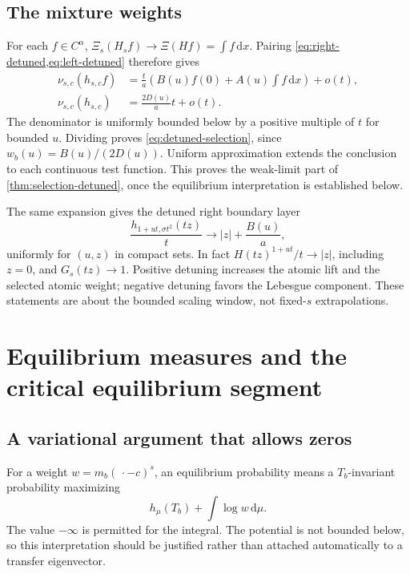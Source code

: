 \documentclass[11pt,a4paper]{article}
\numberwithin{equation}{section}
\theoremstyle{definition}
\theoremstyle{remark}
\newcommand{\dd}{\,\mathrm d}
\begin{document}
\subsection{The mixture weights}
For each $f\in C^\alpha$,
$\Xi_s(H_sf)\to\Xi(Hf)=\int f\dd x$. Pairing
\cref{eq:right-detuned,eq:left-detuned} therefore gives
\begin{align}
 \nu_{s,c}(h_{s,c}f)
    &=\frac{t}{a}\left(B(u)f(0)+A(u)\int f\dd x\right)+o(t),\\
 \nu_{s,c}(h_{s,c})&=\frac{2D(u)}a t+o(t).
 \label{eq:detuned-pairings}
\end{align}
The denominator is uniformly bounded below by a positive multiple of
$t$ for bounded $u$. Dividing proves \cref{eq:detuned-selection}, since
$w_b(u)=B(u)/(2D(u))$. Uniform approximation extends the conclusion to
each continuous test function. This proves the weak-limit part of
\cref{thm:selection-detuned}, once the equilibrium interpretation is
established below.

The same expansion gives the detuned right boundary layer
\begin{equation}
 \frac{h_{1+ut,\sigma t^2}(tz)}t
       \longrightarrow |z|+\frac{B(u)}a,
 \label{eq:boundary-detuned}
\end{equation}
uniformly for $(u,z)$ in compact sets. In fact
$H(tz)^{1+ut}/t\to|z|$, including $z=0$, and $G_s(tz)\to1$.
Positive detuning increases the atomic lift and the selected atomic
weight; negative detuning favors the Lebesgue component. These statements
are about the bounded scaling window, not fixed-$s$ extrapolations.

\section{Equilibrium measures and the critical equilibrium segment}
\label{sec:equilibrium}

\subsection{A variational argument that allows zeros}
For a weight $w=m_b(\,\cdot-c)^s$, an equilibrium probability means a
$T_b$-invariant probability maximizing
\begin{equation}
 h_\mu(T_b)+\int\log w\dd\mu.
 \label{eq:free-energy}
\end{equation}
The value $-\infty$ is permitted for the integral. The potential is not
bounded below, so this interpretation should be justified rather than
attached automatically to a transfer eigenvector.
\end{document}
